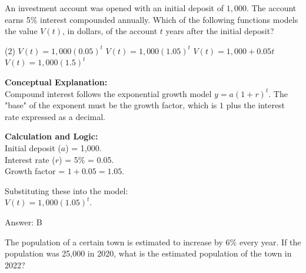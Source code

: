 \documentclass[11pt,paper=a4,answers]{exam}
\begin{document}
\begin{questions}
\pointsinrightmargin
\pointsdroppedatright
\marksnotpoints
{}
\pointformat{\boldmath\themarginpoints}
\bracketedpoints



\question
An investment account was opened with an initial deposit of $1,000$. The account earns 5\% interest compounded annually. Which of the following functions models the value $V(t)$, in dollars, of the account $t$ years after the initial deposit?
\begin{tasks}(2)
    \task $V(t) = 1,000(0.05)^t$
    \task $V(t) = 1,000(1.05)^t$
    \task $V(t) = 1,000 + 0.05t$
    \task $V(t) = 1,000(1.5)^t$
\end{tasks}

\begin{solution}
\textbf{Conceptual Explanation:} \\
Compound interest follows the exponential growth model $y = a(1 + r)^t$. The "base" of the exponent must be the growth factor, which is $1$ plus the interest rate expressed as a decimal.

\vspace{20pt}

\textbf{Calculation and Logic:} \\
Initial deposit ($a$) = 1,000. \\
Interest rate ($r$) = 5\% = 0.05. \\
Growth factor = $1 + 0.05 = 1.05$.

\vspace{10pt}

Substituting these into the model: \\
$V(t) = 1,000(1.05)^t$.

\vspace{25pt}

Answer: \colorbox{yellow!100}{B}
\end{solution}

\vspace{40pt}

\question
The population of a certain town is estimated to increase by 6\% every year. If the population was 25,000 in 2020, what is the estimated population of the town in 2022?


\end{questions}
\end{document}
